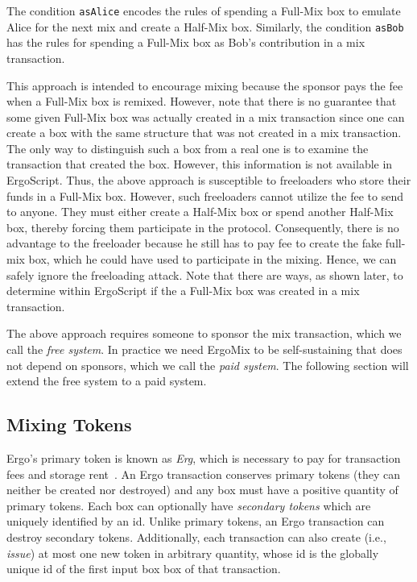 \documentclass[runningheads]{llncs}
\newcommand{\langname}{ErgoScript\xspace}
\newcommand{\mixname}{ErgoMix\xspace}
\begin{document}
The condition \texttt{asAlice} encodes the rules of spending a Full-Mix box to emulate Alice for the next mix and create a Half-Mix box. Similarly, the condition \texttt{asBob} has the rules for spending a Full-Mix box as Bob's contribution in a mix transaction. 

This approach is intended to encourage mixing because the sponsor pays the fee when a Full-Mix box is remixed. However, note that there is no guarantee that some given Full-Mix box was actually created in a mix transaction since one can create a box with the same structure that was not created in a mix transaction. The only way to distinguish such a box from a real one is to examine the transaction that created the box. However, this information is not available in \langname. Thus, the above approach is susceptible to freeloaders who store their funds in a Full-Mix box. However, such freeloaders cannot utilize the fee to send to anyone. They must either create a Half-Mix box or spend another Half-Mix box, thereby forcing them participate in the protocol. Consequently, there is no advantage to the freeloader because he still has to pay fee to create the fake full-mix box, which he could have used to participate in the mixing. Hence, we can safely ignore the freeloading attack. Note that there are ways, as shown later, to determine within \langname if the a Full-Mix box was created in a mix transaction.

The above approach requires someone to sponsor the mix transaction, which we call the {\em free system}. In practice we need \mixname to be self-sustaining that does not depend on sponsors, which we call the {\em paid system}. 
The following section will extend the free system to a paid system. 

\subsection{Mixing Tokens}

Ergo's primary token is known as {\em Erg}, which is necessary to pay for transaction fees and storage rent~\cite{chepurnoy2018systematic}. An Ergo transaction conserves primary tokens (they can neither be created nor destroyed) and any box must have a positive quantity of primary tokens.
Each box can optionally have {\em secondary tokens} which are uniquely identified by an id. Unlike primary tokens, an Ergo transaction can destroy secondary tokens. Additionally, each transaction can also create (i.e., {\em issue}) at most one new token in arbitrary quantity, whose id is the globally unique id of the first input box box of that transaction. 
\end{document}
